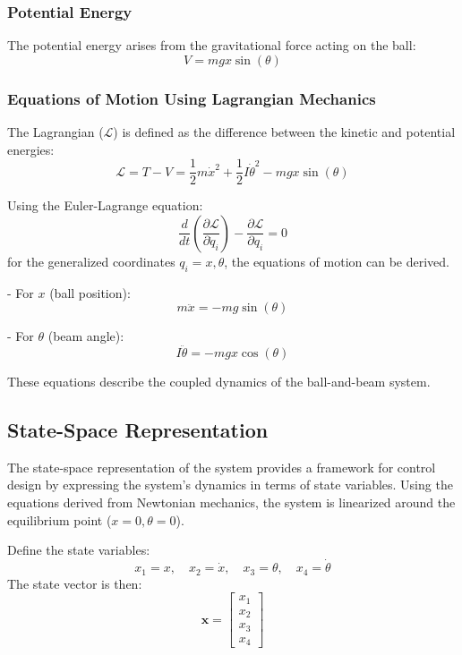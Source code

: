 \documentclass[conference]{IEEEtran}
\begin{document}
\subsubsection{Potential Energy}
\label{subsubsec:model_lag_potential}
The potential energy arises from the gravitational force acting on the ball:
\begin{equation}
V = m g x \sin(\theta)
\end{equation}

\subsubsection{Equations of Motion Using Lagrangian Mechanics}
\label{subsubsec:model_lag_eq}
The Lagrangian (\(\mathcal{L}\)) is defined as the difference between the kinetic and potential energies:
\begin{equation}
\mathcal{L} = T - V = \frac{1}{2} m \dot{x}^2 + \frac{1}{2} I \dot{\theta}^2 - m g x \sin(\theta)
\end{equation}

Using the Euler-Lagrange equation:
\begin{equation}
\frac{d}{dt} \left( \frac{\partial \mathcal{L}}{\partial \dot{q}_i} \right) - \frac{\partial \mathcal{L}}{\partial q_i} = 0
\end{equation}
for the generalized coordinates \(q_i = x, \theta\), the equations of motion can be derived.

- For \(x\) (ball position):
\begin{equation}
m \ddot{x} = -m g \sin(\theta)
\end{equation}

- For \(\theta\) (beam angle):
\begin{equation}
I \ddot{\theta} = -m g x \cos(\theta)
\end{equation}

These equations describe the coupled dynamics of the ball-and-beam system.

\subsection{State-Space Representation}
\label{subsec:model_ss}
The state-space representation of the system provides a framework for control design by expressing the system's dynamics in terms of state variables. Using the equations derived from Newtonian mechanics, the system is linearized around the equilibrium point (\(x = 0, \theta = 0\)).

Define the state variables:
\[
x_1 = x, \quad x_2 = \dot{x}, \quad x_3 = \theta, \quad x_4 = \dot{\theta}
\]
The state vector is then:
\[
\mathbf{x} = \begin{bmatrix} x_1 \\ x_2 \\ x_3 \\ x_4 \end{bmatrix}
\]
\end{document}
